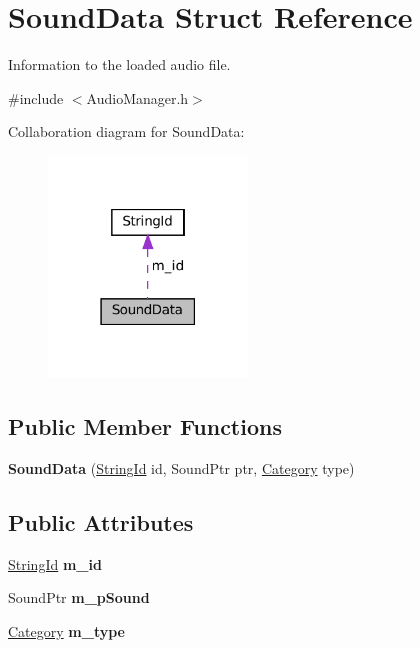 \hypertarget{structSoundData}{}\section{Sound\+Data Struct Reference}
\label{structSoundData}


Information to the loaded audio file.  




{\ttfamily \#include $<$Audio\+Manager.\+h$>$}



Collaboration diagram for Sound\+Data\+:
\nopagebreak
\begin{figure}[H]
\begin{center}
\leavevmode
\includegraphics[width=150pt]{structSoundData__coll__graph}
\end{center}
\end{figure}
\subsection*{Public Member Functions}
\begin{DoxyCompactItemize}
\item 
\mbox{\label{structSoundData_af90adabecb69295833e4feae3b89e620}} 
{\bfseries Sound\+Data} (\hyperlink{classStringId}{String\+Id} id, Sound\+Ptr ptr, \hyperlink{AudioTypes_8h_a9ca8f05608edcbf85ab6c2c85a439ccb}{Category} type)
\end{DoxyCompactItemize}
\subsection*{Public Attributes}
\begin{DoxyCompactItemize}
\item 
\mbox{\label{structSoundData_a9aeca3046bc4f50697a4ca557a374d6d}} 
\hyperlink{classStringId}{String\+Id} {\bfseries m\+\_\+id}
\item 
\mbox{\label{structSoundData_a2b517173ef6f66648568990c5faed0c6}} 
Sound\+Ptr {\bfseries m\+\_\+p\+Sound}
\item 
\mbox{\label{structSoundData_abe64ac7eeaf6aeaa57b0d26fd4b92df4}} 
\hyperlink{AudioTypes_8h_a9ca8f05608edcbf85ab6c2c85a439ccb}{Category} {\bfseries m\+\_\+type}
\end{DoxyCompactItemize}


